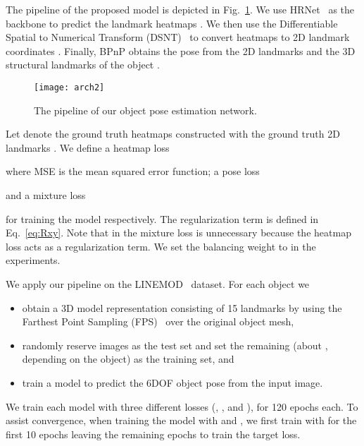 \documentclass[10pt,twocolumn,letterpaper]{article}
\begin{document}
The pipeline of the proposed model is depicted in Fig.~\ref{fig:obpose_pipeline}. We use HRNet~\cite{Sun2019deep} as the backbone to predict the landmark heatmaps . We then use the Differentiable Spatial to Numerical Transform (DSNT)~\cite{Nibali2018numerical} to convert heatmaps  to 2D landmark coordinates . Finally, BPnP obtains the pose  from the 2D landmarks  and the 3D structural landmarks of the object .


\begin{figure} \centering
    \texttt{[image: arch2]}
    \caption{The pipeline of our object pose estimation network. }
    \label{fig:obpose_pipeline}
\end{figure}

Let  denote the ground truth heatmaps constructed with the ground truth 2D landmarks . We define a heatmap loss

where MSE is the mean squared error function; a pose loss

and a mixture loss

for training the model respectively. The regularization term  is defined in Eq.~\eqref{eq:Rxy}. Note that in the mixture loss  is unnecessary because the heatmap loss  acts as a regularization term. We set the balancing weight  to  in the experiments.

We apply our pipeline on the LINEMOD~\cite{Hinterstoisser2012model} dataset. For each object we
\begin{itemize}[leftmargin=1em,topsep=0.3em,parsep=0.3em]
    \item obtain a 3D model representation consisting of 15 landmarks by using the Farthest Point Sampling (FPS)~\cite{Peng2019pvnet} over the original object mesh, 
    \item randomly reserve  images as the test set and set the remaining (about , depending on the object) as the training set, and
    \item train a model to predict the 6DOF object pose from the input image.
\end{itemize}
We train each model with three different losses (, , and ), for 120 epochs each. To assist convergence, when training the model with  and , we first train with  for the first 10 epochs leaving the remaining  epochs to train the target loss. 
\end{document}
